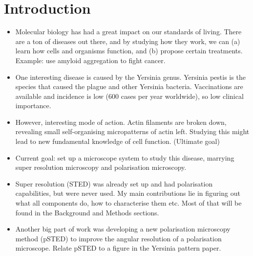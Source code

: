 \chapter{Introduction}

\begin{itemize}
	\item Molecular biology has had a great impact on our standards of living. There are a ton of diseases out there, and by studying how they work, we can (a) learn how cells and organisms function, and (b) propose certain treatments. Example: use amyloid aggregation to fight cancer.
	
	\item One interesting disease is caused by the Yersinia genus. Yersinia pestis is the species that caused the plague and other Yersinia bacteria. Vaccinations are available and incidence is low (600 cases per year worldwide), so low clinical importance.
	
	\item However, interesting mode of action. Actin filaments are broken down, revealing small self-organising micropatterns of actin left. Studying this might lead to new fundamental knowledge of cell function. (Ultimate goal)
	
	\item Current goal: set up a microscope system to study this disease, marrying super resolution microscopy and polarisation microscopy.
	
	\item Super resolution (STED) was already set up and had polarisation capabilities, but were never used. My main contributions lie in figuring out what all components do, how to characterise them etc. Most of that will be found in the Background and Methods sections.
	
	\item Another big part of work was developing a new polarisation microscopy method (pSTED) to improve the angular resolution of a polarisation microscope. Relate pSTED to a figure in the Yersinia pattern paper.
	
\end{itemize}